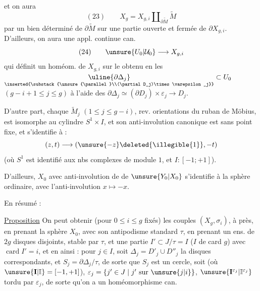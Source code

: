
et on aura
\[
(23)\qquad X_g=X_{g,i}\amalg_{\partial\widetilde M}\widetilde M
\]
par un  bien déterminé de $\partial\widetilde M$ sur une partie ouverte et fermée de $\partial X_{g,i}$. D'ailleurs, on aura une appl. continue can.
\[
(24)\qquad \unsure{U_0|\mathcal U_0}\longrightarrow X_{g,i}
\]
qui définit un homéom. de $X_{g,i}$ sur le   obtenu en  les $\underset{\inserted{\substack{\unsure{\parallel}\\(\partial D_j)\times\varepsilon_j}}}{\uline{\partial\Delta_j}}\subset U_0$ $(g-i+1\leq j\leq g)$ à l'aide des  $\partial\Delta_j\simeq(\partial D_j)\times\varepsilon_j\longrightarrow D_j$.

D'autre part, chaque $\widetilde M_j$ $(1\leq j\leq g-i)$, rev.  orientations du ruban de Möbius, est isomorphe au cylindre $S^1\times I$, et son anti-involution canonique  est sans point fixe, et s'identifie à :
\[
(z,t)\longrightarrow(\unsure{-z}\deleted{\illegible{1}},-t)
\]
(où $S^1$ est identifié aux nbs complexes de module $1$, et $I:[-1;+1]$).

D'ailleurs, $X_0$  avec  anti-involution de  de $\unsure{Y_0|X_0}$ s'identifie à la sphère  ordinaire, avec l'anti-involution $x\longmapsto-x$.


En résumé :

\uline{Proposition} On peut obtenir (pour $0\leq i\leq g$ fixés) les couples $(X_g,\sigma_i)$, à  près, en prenant la sphère   $X_0$, avec son antipodisme standard $\tau$, en prenant un ens. de $2g$ disques   disjoints, stable par $\tau$, et une partie $I'\subset J/\tau=I$ ($I$ de card $g$) avec $\operatorname{card}I'=i$, et en  ainsi : pour  $j\in I$, soit $\Delta_j=D'_j\cup D''_j$ la  disques correspondants, et $S_j=\partial\Delta_j/\tau$, de sorte que $S_j$ est un cercle, soit \figure{[Encadrement ouvert en bas : $T_j=S_j\times\unsure{\mathbf I^{\varepsilon_j}|\mathbb I^{\varepsilon_j}}$.]} (où $\unsure{\mathbf I|\mathbb I}=[-1,+1]$), $\varepsilon_j=\{j'\in J\mid j'\text{ sur }\unsure{j|i}\}$, $\unsure{\mathbf I^{\varepsilon_j}|\mathbb I^{\varepsilon_j}}$ tordu par $\varepsilon_j$, de sorte qu'on a un homéomorphisme can.


